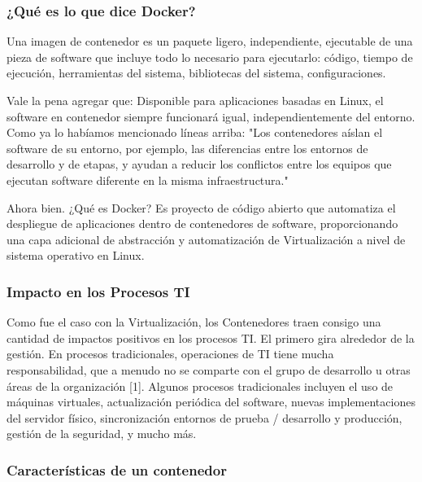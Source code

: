 \documentclass[preprint,12pt]{elsarticle}
\begin{document}
\subsubsection{\textbf{¿Qué es lo que dice Docker?}}
Una imagen de contenedor es un paquete ligero, independiente, ejecutable de una pieza de software que incluye todo lo necesario para ejecutarlo: código, tiempo de ejecución, herramientas del sistema, bibliotecas del sistema, configuraciones.

Vale la pena agregar que: Disponible para aplicaciones basadas en Linux, el software en contenedor siempre funcionará igual, independientemente del entorno. Como ya lo habíamos mencionado líneas arriba: "Los contenedores aíslan el software de su entorno, por ejemplo, las diferencias entre los entornos de desarrollo y de etapas, y ayudan a reducir los conflictos entre los equipos que ejecutan software diferente en la misma infraestructura."

Ahora bien. ¿Qué es Docker? Es proyecto de código abierto que automatiza el despliegue de aplicaciones dentro de contenedores de software, proporcionando una capa adicional de abstracción y automatización de Virtualización a nivel de sistema operativo en Linux.


 
\subsubsection{\textbf{Impacto en los Procesos TI}}

Como fue el caso con la Virtualización, los Contenedores traen consigo una cantidad de impactos positivos en los procesos TI. El primero gira alrededor de la gestión. En procesos tradicionales, operaciones de TI tiene mucha responsabilidad, que a menudo no se comparte con el grupo de desarrollo u otras áreas de la organización [1]. Algunos procesos tradicionales incluyen el uso de máquinas virtuales, actualización periódica del software, nuevas implementaciones del servidor físico, sincronización entornos de prueba / desarrollo y producción, gestión de la seguridad, y mucho más.

\subsubsection{\textbf{Características de un contenedor}}
\end{document}
